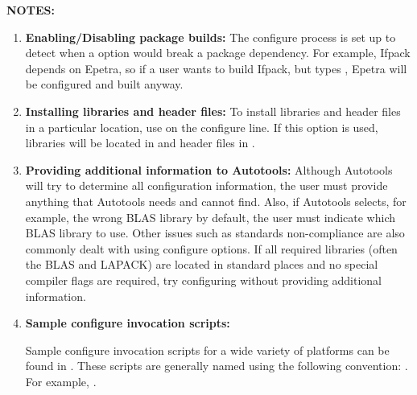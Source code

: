 {\bf NOTES:} 
\begin{enumerate}
\item {\bf Enabling/Disabling package builds:} 
The configure process is set up to detect when a 
 option would break a package dependency.  
For example, Ifpack depends on Epetra, so if a user wants to build Ifpack, but 
types , Epetra will be configured and built 
anyway.  

\item {\bf Installing libraries and header files:}
To install libraries and header files in a particular location, 
use  on the configure line.  If this option is 
used, libraries will be located in  and header files in 
.

\item {\bf Providing additional information to Autotools:}
Although Autotools will try to determine all configuration
information, the user must provide anything that Autotools needs and 
cannot find.  Also, if Autotools selects, for example, the wrong 
BLAS library by default, the user must indicate which BLAS library to use.  
Other issues such as standards 
non-compliance are also commonly dealt with using configure options.  
If all required libraries (often 
the BLAS and LAPACK) are located in standard places and no special 
compiler flags are required, try configuring without
providing additional information.

\item {\bf Sample configure invocation scripts:}

\begin{minipage}[c]{\textwidth}
\begin{minipage}[l]{.6\textwidth}

Sample configure invocation scripts for a wide variety of platforms can be 
found in .  These scripts are generally 
named using the following convention: .
For example, .  
\end{minipage}\hfill
{}
\end{minipage}


\end{enumerate}
